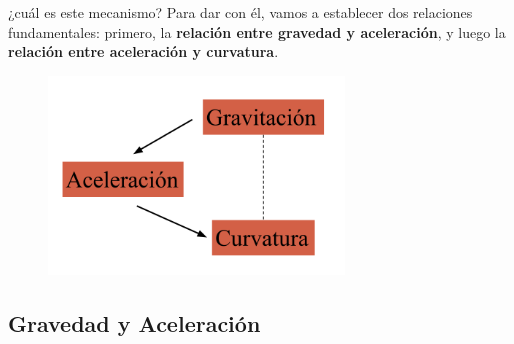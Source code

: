  ¿cuál es este mecanismo? Para dar con él, vamos a establecer dos relaciones fundamentales: primero, la \textbf{relación entre gravedad y aceleración}, y luego la \textbf{relación entre aceleración y curvatura}.


\begin{figure}[h!]
    \centering
    \includegraphics[width=0.7\textwidth]{Im/curvatura aceleracion.png}
    \label{fig:sen}
\end{figure}

\subsection*{\textbf{Gravedad y Aceleración}}


